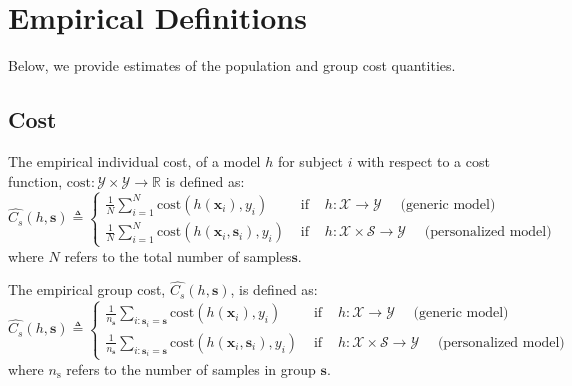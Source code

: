 \section{Empirical Definitions}

Below, we provide estimates of the population and group cost quantities.

\label{sec:empirical_defs}
\subsection{Cost}

 \begin{definition} \label{pop cost}
 The empirical individual cost, of a model $h$ for subject $i$ with respect to a cost function, $\mathrm{cost}: \mathcal{Y} \times \mathcal{Y} \rightarrow \mathbb{R}$ is defined as:
\begin{equation}
    \hat{C_{s}}(h, \mathbf{s}) 
    \triangleq
    \left\{\begin{array}{lll}
\frac{1}{N} \sum_{i=1}^N \mathrm{cost}\left(h\left(\mathbf{x}_i\right), y_i\right) 
& \text { if } & h: \mathcal{X} \rightarrow \mathcal{Y} \quad\text{ (generic model) } 
\\
\frac{1}{N} \sum_{i=1}^N \mathrm{cost}\left(h\left(\mathbf{x}_i, \mathbf{s}_i\right), y_i\right) 
& \text { if } & h: \mathcal{X} \times \mathcal{S} \rightarrow \mathcal{Y}
\quad\text{ (personalized model) }
\end{array}\right.
\end{equation}
where $N$ refers to the total number of samples$\mathbf{s}$.
\end{definition}
 
\begin{definition}
 The empirical group cost, $\hat{C_{s}}(h, \mathbf{s})$, is defined as:
\begin{equation}
    \hat{C_{s}}(h, \mathbf{s}) 
    \triangleq
    \left\{\begin{array}{lll}
\frac{1}{n_{\mathbf{s}}} \sum_{i: \mathbf{s}_i=\mathbf{s}} \mathrm{cost}\left(h\left(\mathbf{x}_i\right), y_i\right) 
& \text { if } & h: \mathcal{X} \rightarrow \mathcal{Y} \quad\text{ (generic model) } 
\\
\frac{1}{n_{\mathbf{s}}} \sum_{i: \mathbf{s}_i=\mathbf{s}} \mathrm{cost}\left(h\left(\mathbf{x}_i, \mathbf{s}_i\right), y_i\right) 
& \text { if } & h: \mathcal{X} \times \mathcal{S} \rightarrow \mathcal{Y}
\quad\text{ (personalized model) }
\end{array}\right.
\end{equation}
where $n_{\mathrm{s}}$ refers to the number of samples in group $\mathbf{s}$.
\end{definition}
